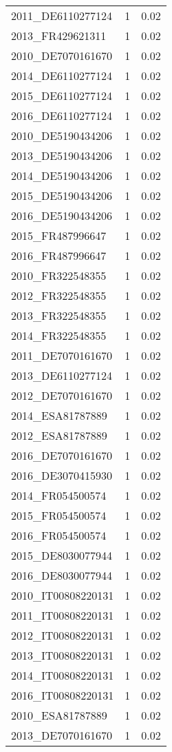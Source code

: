 \begin{table*}[htbp]
\begin{tabular}{lrr}
2011_DE6110277124 & 1 & 0.02 \\
2013_FR429621311 & 1 & 0.02 \\
2010_DE7070161670 & 1 & 0.02 \\
2014_DE6110277124 & 1 & 0.02 \\
2015_DE6110277124 & 1 & 0.02 \\
2016_DE6110277124 & 1 & 0.02 \\
2010_DE5190434206 & 1 & 0.02 \\
2013_DE5190434206 & 1 & 0.02 \\
2014_DE5190434206 & 1 & 0.02 \\
2015_DE5190434206 & 1 & 0.02 \\
2016_DE5190434206 & 1 & 0.02 \\
2015_FR487996647 & 1 & 0.02 \\
2016_FR487996647 & 1 & 0.02 \\
2010_FR322548355 & 1 & 0.02 \\
2012_FR322548355 & 1 & 0.02 \\
2013_FR322548355 & 1 & 0.02 \\
2014_FR322548355 & 1 & 0.02 \\
2011_DE7070161670 & 1 & 0.02 \\
2013_DE6110277124 & 1 & 0.02 \\
2012_DE7070161670 & 1 & 0.02 \\
2014_ESA81787889 & 1 & 0.02 \\
2012_ESA81787889 & 1 & 0.02 \\
2016_DE7070161670 & 1 & 0.02 \\
2016_DE3070415930 & 1 & 0.02 \\
2014_FR054500574 & 1 & 0.02 \\
2015_FR054500574 & 1 & 0.02 \\
2016_FR054500574 & 1 & 0.02 \\
2015_DE8030077944 & 1 & 0.02 \\
2016_DE8030077944 & 1 & 0.02 \\
2010_IT00808220131 & 1 & 0.02 \\
2011_IT00808220131 & 1 & 0.02 \\
2012_IT00808220131 & 1 & 0.02 \\
2013_IT00808220131 & 1 & 0.02 \\
2014_IT00808220131 & 1 & 0.02 \\
2016_IT00808220131 & 1 & 0.02 \\
2010_ESA81787889 & 1 & 0.02 \\
2013_DE7070161670 & 1 & 0.02 \\

\end{tabular}
\end{table*}
